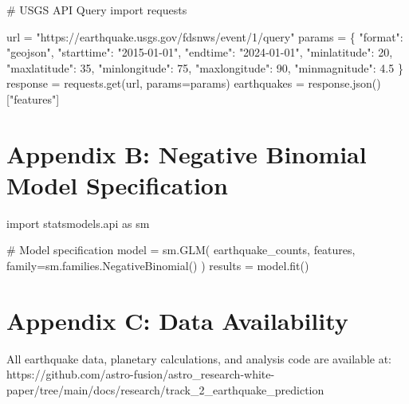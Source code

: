 \documentclass[
  11pt,
  a4paper,
  oneside,
  openany]{article}
\newenvironment{Shaded}{\begin{snugshade}}{\end{snugshade}}
\newcommand{\CommentTok}[1]{\textcolor[rgb]{0.37,0.37,0.37}{#1}}
\newcommand{\DecValTok}[1]{\textcolor[rgb]{0.68,0.00,0.00}{#1}}
\newcommand{\FloatTok}[1]{\textcolor[rgb]{0.68,0.00,0.00}{#1}}
\newcommand{\ImportTok}[1]{\textcolor[rgb]{0.00,0.46,0.62}{#1}}
\newcommand{\NormalTok}[1]{\textcolor[rgb]{0.00,0.23,0.31}{#1}}
\newcommand{\OperatorTok}[1]{\textcolor[rgb]{0.37,0.37,0.37}{#1}}
\newcommand{\StringTok}[1]{\textcolor[rgb]{0.13,0.47,0.30}{#1}}
\begin{document}
\begin{Shaded}
\begin{Highlighting}[]
\CommentTok{\# USGS API Query}
\ImportTok{import}\NormalTok{ requests}

\NormalTok{url }\OperatorTok{=} \StringTok{"https://earthquake.usgs.gov/fdsnws/event/1/query"}
\NormalTok{params }\OperatorTok{=}\NormalTok{ \{}
    \StringTok{"format"}\NormalTok{: }\StringTok{"geojson"}\NormalTok{,}
    \StringTok{"starttime"}\NormalTok{: }\StringTok{"2015{-}01{-}01"}\NormalTok{,}
    \StringTok{"endtime"}\NormalTok{: }\StringTok{"2024{-}01{-}01"}\NormalTok{,}
    \StringTok{"minlatitude"}\NormalTok{: }\DecValTok{20}\NormalTok{,}
    \StringTok{"maxlatitude"}\NormalTok{: }\DecValTok{35}\NormalTok{,}
    \StringTok{"minlongitude"}\NormalTok{: }\DecValTok{75}\NormalTok{,}
    \StringTok{"maxlongitude"}\NormalTok{: }\DecValTok{90}\NormalTok{,}
    \StringTok{"minmagnitude"}\NormalTok{: }\FloatTok{4.5}
\NormalTok{\}}
\NormalTok{response }\OperatorTok{=}\NormalTok{ requests.get(url, params}\OperatorTok{=}\NormalTok{params)}
\NormalTok{earthquakes }\OperatorTok{=}\NormalTok{ response.json()[}\StringTok{"features"}\NormalTok{]}
\end{Highlighting}
\end{Shaded}

\section{Appendix B: Negative Binomial Model
Specification}\label{appendix-b-negative-binomial-model-specification}

\begin{Shaded}
\begin{Highlighting}[]
\ImportTok{import}\NormalTok{ statsmodels.api }\ImportTok{as}\NormalTok{ sm}

\CommentTok{\# Model specification}
\NormalTok{model }\OperatorTok{=}\NormalTok{ sm.GLM(}
\NormalTok{    earthquake\_counts,}
\NormalTok{    features,}
\NormalTok{    family}\OperatorTok{=}\NormalTok{sm.families.NegativeBinomial()}
\NormalTok{)}
\NormalTok{results }\OperatorTok{=}\NormalTok{ model.fit()}
\end{Highlighting}
\end{Shaded}

\section{Appendix C: Data
Availability}\label{appendix-c-data-availability}

All earthquake data, planetary calculations, and analysis code are
available at:
https://github.com/astro-fusion/astro\_research-white-paper/tree/main/docs/research/track\_2\_earthquake\_prediction
\end{document}
